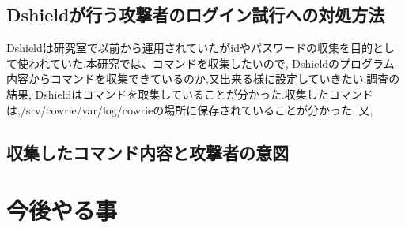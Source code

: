 \documentclass{entry}
\begin{document}
\subsection{Dshieldが行う攻撃者のログイン試行への対処方法}
Dshieldは研究室で以前から運用されていたがidやパスワードの収集を目的として使われていた.本研究では、コマンドを収集したいので,
Dshieldのプログラム内容からコマンドを収集できているのか,又出来る様に設定していきたい.調査の結果,
Dshieldはコマンドを取集していることが分かった.収集したコマンドは,/srv/cowrie/var/log/cowrieの場所に保存されていることが分かった.
又,

\subsection{収集したコマンド内容と攻撃者の意図}


\section{今後やる事}




%

\end{document}
